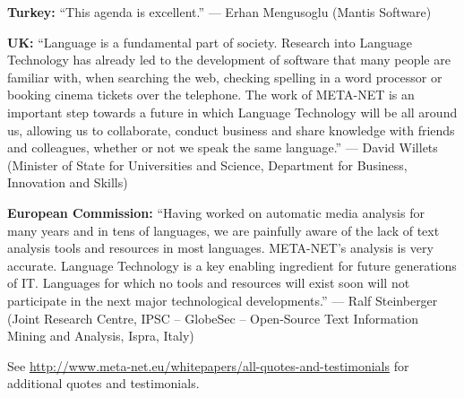 \documentclass[10pt, plain]{../../metanetpaper}
\begin{document}
\medskip \textbf{Turkey:} ``This agenda is excellent.'' --- Erhan Mengusoglu (Mantis Software)

\medskip \textbf{UK:} ``Language is a fundamental part of society. Research into Language Technology has already led to the development of software that many people are familiar with, when searching the web, checking spelling in a word processor or booking cinema tickets over the telephone. The work of META-NET is an important step towards a future in which Language Technology will be all around us, allowing us to collaborate, conduct business and share knowledge with friends and colleagues, whether or not we speak the same language.'' --- David Willets (Minister of State for Universities and Science, Department for Business, Innovation and Skills)

\medskip \textbf{European Commission:} ``Having worked on automatic media analysis for many years and in tens of languages, we are painfully aware of the lack of text analysis tools and resources in most languages. META-NET's analysis is very accurate. Language Technology is a key enabling ingredient for future generations of IT. Languages for which no tools and resources will exist soon will not participate in the next major technological developments.'' --- Ralf Steinberger (Joint Research Centre, 
IPSC -- GlobeSec -- Open-Source Text Information Mining and Analysis, Ispra, Italy)

\smallskip \centerline{\small See \url{http://www.meta-net.eu/whitepapers/all-quotes-and-testimonials} for additional quotes and testimonials.}

\clearpage

~

\vfill

\centerline{\normalsize{}}
\end{document}
